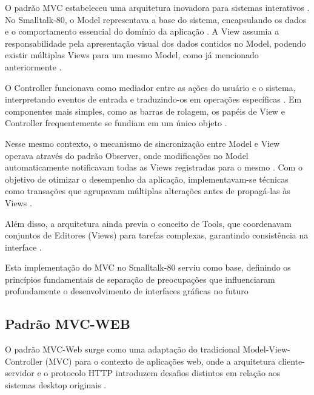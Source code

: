         \par O padrão MVC estabeleceu uma arquitetura inovadora para sistemas interativos \cite{artigo:reenskaug:2003}. No Smalltalk-80, o Model representava a base do sistema, encapsulando os dados e o comportamento essencial do domínio da aplicação \cite{artigo:reenskaug:2003}. A View assumia a responsabilidade pela apresentação visual dos dados contidos no Model, podendo existir múltiplas Views para um mesmo Model, como já mencionado anteriormente \cite{artigo:reenskaug:2003}.
        
        \par O Controller funcionava como mediador entre as ações do usuário e o sistema, interpretando eventos de entrada e traduzindo-os em operações específicas \cite{artigo:reenskaug:2003}. Em componentes mais simples, como as barras de rolagem, os papéis de View e Controller frequentemente se fundiam em um único objeto \cite{artigo:reenskaug:2003}.

        \par Nesse mesmo contexto, o mecanismo de sincronização entre Model e View operava através do padrão Observer, onde modificações no Model automaticamente notificavam todas as Views registradas para o mesmo \cite{artigo:reenskaug:2003}. Com o objetivo de otimizar o desempenho da aplicação, implementavam-se técnicas como transações que agrupavam múltiplas alterações antes de propagá-las às Views \cite{artigo:reenskaug:2003}.
        
        \par Além disso, a arquitetura ainda previa o conceito de Tools, que coordenavam conjuntos de Editores (Views) para tarefas complexas, garantindo consistência na interface \cite{artigo:reenskaug:2003}. 
        
        \par Esta implementação do MVC no Smalltalk-80 serviu como base, definindo os princípios fundamentais de separação de preocupações que influenciaram profundamente o desenvolvimento de interfaces gráficas no futuro \cite{artigo:reenskaug:2003}
            
    \subsection{Padrão MVC-WEB}
        \par O padrão MVC-Web surge como uma adaptação do tradicional Model-View-Controller (MVC) para o contexto de aplicações web, onde a arquitetura cliente-servidor e o protocolo HTTP introduzem desafios distintos em relação aos sistemas desktop originais \cite{inproceedings:grove:2011}.

